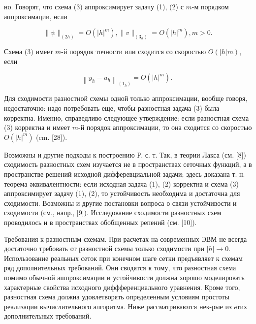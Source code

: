 \documentclass[10pt]{article}
\begin{document}
но. Говорят, что схема (3) аппроксимирует задачу (1), (2) с $m$-м порядком аппроксимации, өсли



\[

\|\psi\|_{(2 h)}=O\left(|h|^{m}\right),\|v\|_{\left(3_{h}\right)}=O\left(|h|^{m}\right), m>0 .

\]



Схема (3) имеет $m$-й порядок точности или сходится со скоростью $O(|h| m)$, если



\[

\left\|y_{h}-u_{h}\right\|_{\left(1_{h}\right)}=O\left(|h|^{m}\right) \text {. }

\]



Для сходимости разностной схемы одной только аппроксимации, вообще говоря, недостаточно: надо потребовать еще, чтобы разностная задача (3) была корректна. Именно, справедливо следующее утверждение: если разностная схема (3) корректна и имеет $m$-й порядок аппроксимации, то она сходится со скоростью $O\left(|h|^{m}\right)$ (cm. [28]).



Возможны и другие подходы к построению Р. с. т. Так, в теории Лакса (см. [8]) сходимость разностных схем изучается не в пространствах сеточных функций, а в пространстве решений исходной дифферевциальной задачи; здесь доказана т. н. теорема әквивалентности: если исходная задача (1), (2) корректна и схема (3) аппроксимирует задачу (1), (2), то устойчивость необходима и достаточна для сходимости. Возможны и другие постановки вопроса о связи устойчивости и сходимости (см., напр., [9]). Исследование сходимости разностных схем проводилось и в пространствах обобщенных репений (см. [10]).



Требования к разностным схемам. При расчетах на современных ЭВМ не всегда достаточно требовать от разностной схемы только сходимости при $|h| \rightarrow 0$. Использование реальных сеток при конечном шаге сетки предъявляет к схемам ряд дополнительных требований. Они сводятся к тому, что разностная схема помимо обычной ашпроксимации и устойчивости должна хорошо моделировать характерные свойства исходного диффференциального уравнения. Кроме того, разностная схема должна удовлетворять определенным условиям простоты реализации вычислительного алгоритма. Ниже рассматриваются нек-рые из әтих дополнительных требований.
\end{document}
